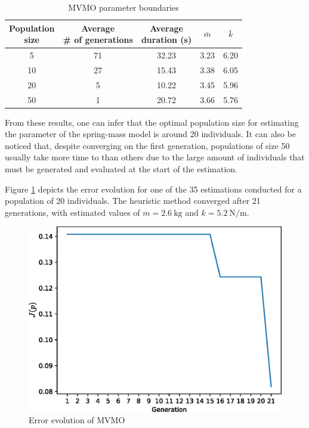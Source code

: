 \begin{table}[!h]
	\centering
	\caption{MVMO parameter boundaries}
	\begin{tabular}{c|cccc}
		\shortstack{Population \\ size} & \shortstack{Average \\ \# of generations} & \shortstack{Average \\ duration (s)} & $\bar{m}$ & $\bar{k}$ \\
		\hline
		5 & 71 & 32.23 & 3.23 & 6.20 \\
		10 & 27 & 15.43 & 3.38 & 6.05 \\
		20 & 5 & 10.22 & 3.45 & 5.96 \\
		50 & 1 & 20.72 & 3.66 & 5.76 \\
	\end{tabular}
	\label{tab: spring_mass_MVMO_size}
\end{table}

From these results, one can infer that the optimal population size for estimating the parameter of the spring-mass model is around 20 individuals. It can also be noticed that, despite converging on the first generation, populations of size 50 usually take more time to than others due to the large amount of individuals that must be generated and evaluated at the start of the estimation.

Figure \ref{fig: MVMO_conv} depicts the error evolution for one of the 35 estimations conducted for a population of 20 individuals. The heuristic method converged after 21 generations, with estimated values of $m=2.6\ \text{kg}$ and $k=5.2\ \text{N/m}$.

\begin{figure}[h]
	\caption{Error evolution of MVMO}
	\begin{center}
		\includegraphics[scale=0.6]{Images/MVMO_conv.eps}
	\end{center}
	\label{fig: MVMO_conv}
\end{figure}

